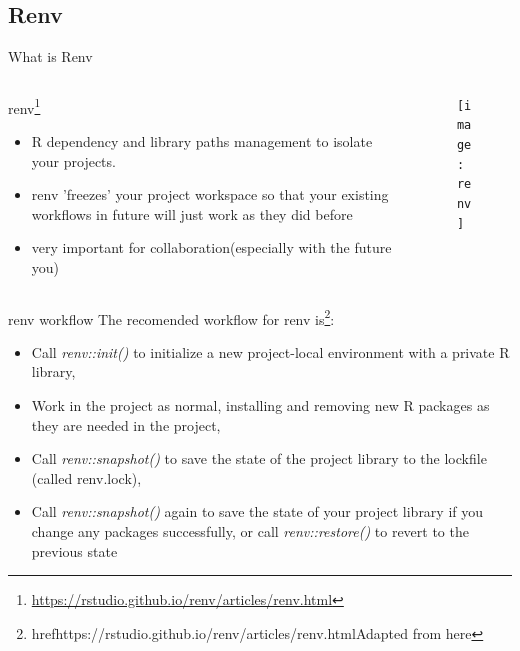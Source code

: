 \documentclass[fleqn]{beamer}\usepackage[]{graphicx}\usepackage[]{color}
\begin{document}
\subsection{Renv}
\begin{frame}{What is Renv}
\begin{columns}[T] %
\begin{column}{.48\textwidth}
renv\footnote{\href{https://rstudio.github.io/renv/articles/renv.html}{https://rstudio.github.io/renv/articles/renv.html}}
\begin{itemize}
  \item R dependency and library paths management to isolate your projects.
  \item renv 'freezes' your project workspace so that your existing workflows in future will just work as they did before
  \item very important for collaboration(especially with the future you)
\end{itemize}
\end{column}%
\hfill%
\begin{column}{.48\textwidth}
\begin{figure}[htp]
    \centering
    \texttt{[image: renv]}
\end{figure}
\end{column}%
\end{columns}
\end{frame}

\begin{frame}{renv workflow}
The recomended workflow for renv is\footnote{href{https://rstudio.github.io/renv/articles/renv.html}{Adapted from here}}:
\begin{itemize}
\item Call \textit{renv::init()} to initialize a new project-local environment with a private R library,

\item Work in the project as normal, installing and removing new R packages as they are needed in the project,

\item Call \textit{renv::snapshot()} to save the state of the project library to the lockfile (called renv.lock),


\item Call \textit{renv::snapshot()} again to save the state of your project library if you change any packages successfully, or call \textit{renv::restore()} to revert to the previous state 
\end{itemize}
\end{frame}
\end{document}
